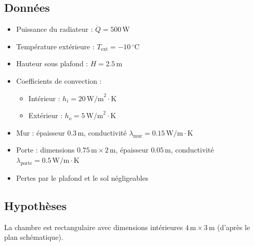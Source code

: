 \documentclass{rapportECL}
\begin{document}
\subsection*{Données}
\begin{itemize}
    \item Puissance du radiateur : \( \dot{Q} = 500 \, \text{W} \)
    \item Température extérieure : \( T_{\text{ext}} = -10 \, ^\circ \text{C} \)
    \item Hauteur sous plafond : \( H = 2.5 \, \text{m} \)
    \item Coefficients de convection :
        \begin{itemize}
            \item Intérieur : \( h_i = 20 \, \text{W/m}^2 \cdot \text{K} \)
            \item Extérieur : \( h_o = 5 \, \text{W/m}^2 \cdot \text{K} \)
        \end{itemize}
    \item Mur : épaisseur \( 0.3 \, \text{m} \), conductivité \( \lambda_{\text{mur}} = 0.15 \, \text{W/m} \cdot \text{K} \)
    \item Porte : dimensions \( 0.75 \, \text{m} \times 2 \, \text{m} \), épaisseur \( 0.05 \, \text{m} \), conductivité \( \lambda_{\text{porte}} = 0.5 \, \text{W/m} \cdot \text{K} \)
    \item Pertes par le plafond et le sol négligeables
\end{itemize}

\subsection*{Hypothèses}
La chambre est rectangulaire avec dimensions intérieures \( 4 \, \text{m} \times 3 \, \text{m} \) (d'après le plan schématique).
\end{document}
